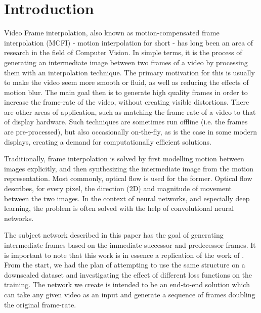 \documentclass[10pt,twocolumn,letterpaper]{article}
\begin{document}

\section{Introduction}
\label{sec:introduction}

Video Frame interpolation, also known as motion-compensated frame interpolation (MCFI) - motion interpolation for short - has long been an area of research in the field of Computer Vision. In simple terms, it is the process of generating an intermediate image between two frames of a video by processing them with an interpolation technique. The primary motivation for this is usually to make the video seem more smooth or fluid, as well as reducing the effects of motion blur. The main goal then is to generate high quality frames in order to increase the frame-rate of the video, without creating visible distortions. There are other areas of application, such as matching the frame-rate of a video to that of display hardware. Such techniques are sometimes run offline (i.e. the frames are pre-processed), but also occasionally on-the-fly, as is the case in some modern displays, creating a demand for computationally efficient solutions.

Traditionally, frame interpolation is solved by first modelling motion between images explicitly, and then synthesizing the intermediate image from the motion representation. Most commonly, optical flow is used for the former. Optical flow describes, for every pixel, the direction (2D) and magnitude of movement between the two images.
In the context of neural networks, and especially deep learning, the problem is often solved with the help of convolutional neural networks.

The subject network described in this paper has the goal of generating intermediate frames based on the immediate successor and predecessor frames.
It is important to note that this work is in essence a replication of the work of \citeauthor{SepConv}. From the start, we had the plan of attempting to use the same structure on a downscaled dataset and investigating the effect of different loss functions on the training.
The network we create is intended to be an end-to-end solution which can take any given video as an input and generate a sequence of frames doubling the original frame-rate.

\end{document}

